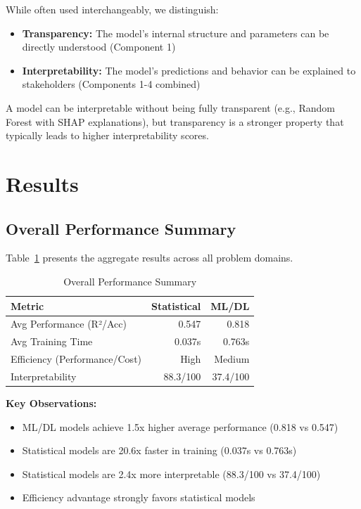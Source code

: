 \documentclass[11pt,a4paper]{article}
\begin{document}
While often used interchangeably, we distinguish:
\begin{itemize}
    \item \textbf{Transparency:} The model's internal structure and parameters can be directly understood (Component 1)
    \item \textbf{Interpretability:} The model's predictions and behavior can be explained to stakeholders (Components 1-4 combined)
\end{itemize}

A model can be interpretable without being fully transparent (e.g., Random Forest with SHAP explanations), but transparency is a stronger property that typically leads to higher interpretability scores.

\section{Results}

\subsection{Overall Performance Summary}

Table~\ref{tab:overall_summary} presents the aggregate results across all problem domains.

\begin{table}[h]
\centering
\begin{tabular}{lrr}
\toprule
\textbf{Metric} & \textbf{Statistical} & \textbf{ML/DL} \\
\midrule
Avg Performance (R²/Acc) & 0.547 & \textcolor{mlcolor}{0.818} \\
Avg Training Time & \textcolor{statcolor}{0.037s} & 0.763s \\
Efficiency (Performance/Cost) & \textcolor{accentcolor}{High} & Medium \\
Interpretability & \textcolor{accentcolor}{88.3/100} & 37.4/100 \\
\bottomrule
\end{tabular}
\caption{Overall Performance Summary}
\label{tab:overall_summary}
\end{table}

\textbf{Key Observations:}
\begin{itemize}
    \item ML/DL models achieve 1.5x higher average performance (0.818 vs 0.547)
    \item Statistical models are 20.6x faster in training (0.037s vs 0.763s)
    \item Statistical models are 2.4x more interpretable (88.3/100 vs 37.4/100)
    \item Efficiency advantage strongly favors statistical models
\end{itemize}
\end{document}
